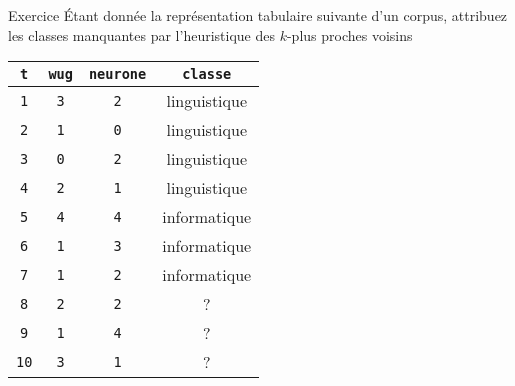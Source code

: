 \documentclass[hyperref={unicode}, xcolor={svgnames}, french]{beamer}
\title{\titlepagetitle}
\subtitle{\titlepagesubtitle}
\author{\textbf{\myname} (\mylab)}
\institute{}
\date{\tiny Version {\yyyymmdddate\today}T\currenttime}
\begin{document}

\begin{frame}[plain]
	\titlepage
\end{frame}

\begin{frame}[fragile=singleslide]{Exercice}
	Étant donnée la représentation tabulaire suivante d'un corpus, attribuez les classes manquantes par l'heuristique des $k$-plus proches voisins
	\begin{table}
		\begin{tabu} to .9
			\texttt{t}  & \texttt{wug} & \texttt{neurone} & \texttt{classe}\\
			\hline
			\texttt{1}  & \texttt{3}      & \texttt{2}	& linguistique\\
			\texttt{2}  & \texttt{1}      & \texttt{0}	& linguistique\\
			\texttt{3}  & \texttt{0}      & \texttt{2}	& linguistique\\
			\texttt{4}  & \texttt{2}      & \texttt{1}	& linguistique\\
			\texttt{5}  & \texttt{4}      & \texttt{4}	& informatique\\
			\texttt{6}  & \texttt{1}      & \texttt{3}	& informatique\\
			\texttt{7}  & \texttt{1}      & \texttt{2}	& informatique\\
			\texttt{8}  & \texttt{2}      & \texttt{2}	& ?\\
			\texttt{9}  & \texttt{1}      & \texttt{4}	& ?\\
			\texttt{10}  & \texttt{3}      & \texttt{1}	& ?\\
		\end{tabu}
	\end{table}
\end{frame}
\end{document}
